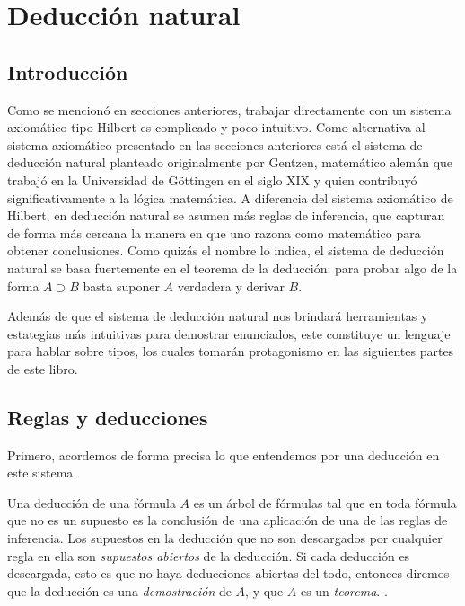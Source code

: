 \documentclass{article}
\begin{document}
\section{Deducción natural}\label{sec:deduccion_natural}
\subsection{Introducción}

Como se mencionó en secciones anteriores, trabajar directamente con un sistema axiomático tipo Hilbert es complicado y poco intuitivo. Como alternativa al sistema axiomático presentado en las secciones anteriores está el sistema de deducción natural planteado originalmente por Gentzen, matemático alemán que trabajó en la Universidad de Göttingen en el siglo XIX y quien contribuyó significativamente a la lógica matemática. A diferencia del sistema axiomático de Hilbert, en deducción natural se asumen más reglas de inferencia, que capturan de forma más cercana la manera en que uno razona como matemático para obtener conclusiones. Como quizás el nombre lo indica, el sistema de deducción natural se basa fuertemente en el teorema de la deducción: para probar algo de la forma $A \supset B$ basta suponer $A$ verdadera y derivar $B$. 

Además de que el sistema de deducción natural nos brindará herramientas y estategias más intuitivas para demostrar enunciados, este constituye un lenguaje para hablar sobre tipos, los cuales tomarán protagonismo en las siguientes partes de este libro.

\subsection{Reglas y deducciones}

Primero, acordemos de forma precisa lo que entendemos por una deducción en este sistema.
\begin{definition}
    Una deducción de una fórmula $A$ es un árbol de fórmulas tal que en toda fórmula que no es un supuesto es la conclusión de una aplicación de una de las reglas de inferencia.
    Los supuestos en la deducción que no son descargados por cualquier regla en ella son \emph{supuestos abiertos} de la deducción.
    Si cada deducción es descargada, esto es que no haya deducciones abiertas del todo, entonces diremos que la deducción es una \emph{demostración} de $A$, y que $A$ es un \emph{teorema}. \cite{PaoloMancosu56}.
\end{definition}
\end{document}
